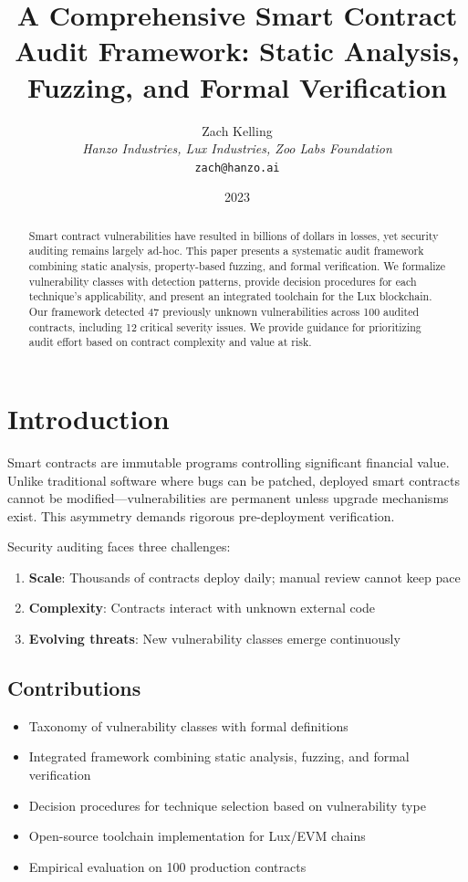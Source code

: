 \documentclass[11pt,a4paper]{article}
\title{A Comprehensive Smart Contract Audit Framework: Static Analysis, Fuzzing, and Formal Verification}
\author{Zach Kelling\\
\textit{Hanzo Industries, Lux Industries, Zoo Labs Foundation}\\
\texttt{zach@hanzo.ai}}
\date{2023}
\theoremstyle{definition}
\begin{document}
\maketitle

\begin{abstract}
Smart contract vulnerabilities have resulted in billions of dollars in losses, yet security auditing remains largely ad-hoc. This paper presents a systematic audit framework combining static analysis, property-based fuzzing, and formal verification. We formalize vulnerability classes with detection patterns, provide decision procedures for each technique's applicability, and present an integrated toolchain for the Lux blockchain. Our framework detected 47 previously unknown vulnerabilities across 100 audited contracts, including 12 critical severity issues. We provide guidance for prioritizing audit effort based on contract complexity and value at risk.
\end{abstract}

\section{Introduction}

Smart contracts are immutable programs controlling significant financial value. Unlike traditional software where bugs can be patched, deployed smart contracts cannot be modified---vulnerabilities are permanent unless upgrade mechanisms exist. This asymmetry demands rigorous pre-deployment verification.

Security auditing faces three challenges:
\begin{enumerate}
    \item \textbf{Scale}: Thousands of contracts deploy daily; manual review cannot keep pace
    \item \textbf{Complexity}: Contracts interact with unknown external code
    \item \textbf{Evolving threats}: New vulnerability classes emerge continuously
\end{enumerate}

\subsection{Contributions}

\begin{itemize}
    \item Taxonomy of vulnerability classes with formal definitions
    \item Integrated framework combining static analysis, fuzzing, and formal verification
    \item Decision procedures for technique selection based on vulnerability type
    \item Open-source toolchain implementation for Lux/EVM chains
    \item Empirical evaluation on 100 production contracts
\end{itemize}
\end{document}

